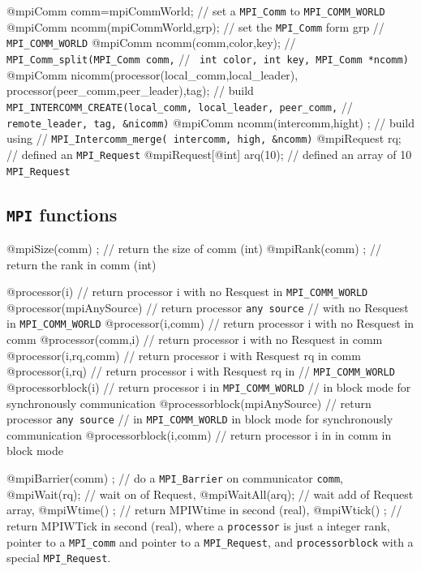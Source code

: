 \documentclass[a4paper,twoside,12pt]{book}
\begin{document}
   @mpiComm  comm=mpiCommWorld; //  set a \texttt{MPI\_Comm} to \texttt{MPI\_COMM\_WORLD}
   @mpiComm  ncomm(mpiCommWorld,grp); // set the \texttt{MPI\_Comm} form grp
    // \texttt{MPI\_COMM\_WORLD}
   @mpiComm  ncomm(comm,color,key); // \verb!MPI_Comm_split(MPI_Comm comm,!
   // \verb! int color, int key, MPI_Comm *ncomm)!
   @mpiComm  nicomm(processor(local_comm,local_leader),
                    processor(peer_comm,peer_leader),tag);
 // build \verb! MPI_INTERCOMM_CREATE(local_comm, local_leader, peer_comm,!
 // \verb! remote_leader, tag, &nicomm)!
   @mpiComm  ncomm(intercomm,hight) ; // build using
   // \verb!MPI_Intercomm_merge( intercomm, high, &ncomm)!
   @mpiRequest rq; // defined  an \verb!MPI_Request!
   @mpiRequest[@int] arq(10); // defined an array of 10 \verb!MPI_Request!
\eFF

\subsection{\texttt{MPI} functions}
\bFF
   @mpiSize(comm) ; // return the size of comm (int)
   @mpiRank(comm) ; // return the rank  in comm (int)

   @processor(i) // return  processor  i with no Resquest in \verb!MPI_COMM_WORLD!
   @processor(mpiAnySource) // return processor \texttt{any source} 
   // with no Resquest in \verb!MPI_COMM_WORLD!
   @processor(i,comm) // return processor i with  no Resquest in comm
   @processor(comm,i) // return processor i with  no Resquest in comm
   @processor(i,rq,comm) // return  processor i with Resquest rq  in comm
   @processor(i,rq) // return  processor i with Resquest rq in
   // \verb!MPI_COMM_WORLD!
   @processorblock(i) // return  processor i  in \verb!MPI_COMM_WORLD! 
   // in block mode for synchronously communication
   @processorblock(mpiAnySource) // return processor  \texttt{any source}
   // in \verb!MPI_COMM_WORLD!  in block mode for synchronously communication
   @processorblock(i,comm) // return processor i in in comm  in block mode

   @mpiBarrier(comm) ; // do a  \texttt{MPI\_Barrier} on communicator \texttt{comm}, 
   @mpiWait(rq); // wait on of Request, 
   @mpiWaitAll(arq); // wait add of Request array,
   @mpiWtime() ; //  return MPIWtime in second (real),
   @mpiWtick() ; // return MPIWTick in second (real),
\eFF
where  a \texttt{processor} is just  a integer rank, pointer to  a \verb!MPI_comm! and pointer to a \verb!MPI_Request!,
and \texttt{processorblock} with a special \verb!MPI_Request!.
\end{document}
